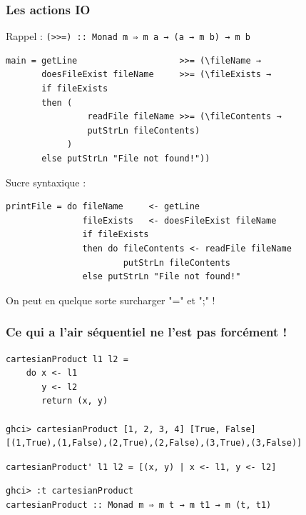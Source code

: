 \documentclass[10pt]{beamer}
\begin{document}
\begin{frame}[fragile]
\frametitle{Les actions IO}

Rappel : \verb|(>>=) :: Monad m ⇒ m a → (a → m b) → m b|

\begin{verbatim}
main = getLine                    >>= (\fileName →
       doesFileExist fileName     >>= (\fileExists →
       if fileExists
       then (
                readFile fileName >>= (\fileContents →
                putStrLn fileContents)
            )
       else putStrLn "File not found!"))
\end{verbatim}

\pause

Sucre syntaxique :

\begin{verbatim}
printFile = do fileName     <- getLine
               fileExists   <- doesFileExist fileName
               if fileExists
               then do fileContents <- readFile fileName
                       putStrLn fileContents
               else putStrLn "File not found!"
\end{verbatim}

On peut en quelque sorte surcharger "=" et ";" !

\end{frame}



\begin{frame}[fragile]
\frametitle{Ce qui a l'air séquentiel ne l'est pas forcément !}
\begin{verbatim}
cartesianProduct l1 l2 =
    do x <- l1
       y <- l2
       return (x, y)

ghci> cartesianProduct [1, 2, 3, 4] [True, False]
[(1,True),(1,False),(2,True),(2,False),(3,True),(3,False)]
\end{verbatim}

\pause

\begin{verbatim}
cartesianProduct' l1 l2 = [(x, y) | x <- l1, y <- l2]
\end{verbatim}

\pause

\begin{verbatim}
ghci> :t cartesianProduct
cartesianProduct :: Monad m ⇒ m t → m t1 → m (t, t1)
\end{verbatim}

\end{frame}
\end{document}
